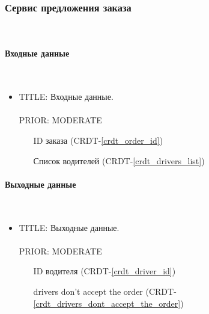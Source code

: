 \subsubsection{Сервис предложения заказа} \mbox{} \\ \label{order_offering_service}

    \paragraph{Входные данные} \mbox{} \\ \label{}

      \begin{itemize}

        \item{

          TITLE: Входные данные.\\
          \\
          PRIOR: MODERATE\\

        }

        \begin{itemize}
          \item [ID заказа] (CRDT-\ref{crdt_order_id})
          \item [Список водителей] (CRDT-\ref{crdt_drivers_list})
        \end{itemize}

      \end{itemize}

    \paragraph{Выходные данные} \mbox{} \\

      \begin{itemize}

        \item{

          TITLE: Выходные данные.\\
          \\
          PRIOR: MODERATE\\

        }

        \begin{itemize}
          \item [ID водителя] (CRDT-\ref{crdt_driver_id})
          \item [drivers don't accept the order] (CRDT-\ref{crdt_drivers_dont_accept_the_order})
        \end{itemize}

      \end{itemize}

